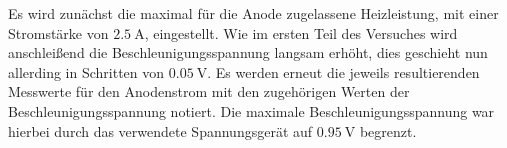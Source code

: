 \noindent
Es wird zunächst die maximal für die Anode zugelassene Heizleistung, mit einer Stromstärke von $\SI{2,5}{\ampere}$, eingestellt. Wie im ersten Teil des Versuches wird
anschleißend die Beschleunigungsspannung langsam erhöht, dies geschieht nun allerding in Schritten von $\SI{0,05}{\volt}$. Es werden erneut die jeweils resultierenden
Messwerte für den Anodenstrom mit den zugehörigen Werten der Beschleunigungsspannung notiert. Die maximale Beschleunigungsspannung war hierbei durch das verwendete
Spannungsgerät auf $\SI{0,95}{\volt}$ begrenzt.

